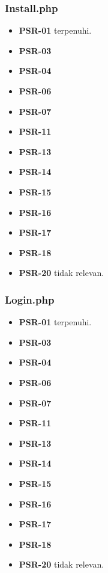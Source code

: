\subsubsection{Install.php}
\begin{itemize}
	\item \textbf{PSR-01} terpenuhi.
	\item \textbf{PSR-03}
	\item \textbf{PSR-04}
	\item \textbf{PSR-06}
	\item \textbf{PSR-07}
	\item \textbf{PSR-11}
	\item \textbf{PSR-13}
	\item \textbf{PSR-14}
	\item \textbf{PSR-15}
	\item \textbf{PSR-16}
	\item \textbf{PSR-17} 
	\item \textbf{PSR-18} 
	\item \textbf{PSR-20} tidak relevan.
\end{itemize}

\subsubsection{Login.php} 
\begin{itemize}
	\item \textbf{PSR-01} terpenuhi.
	\item \textbf{PSR-03}
	\item \textbf{PSR-04}
	\item \textbf{PSR-06}
	\item \textbf{PSR-07}
	\item \textbf{PSR-11}
	\item \textbf{PSR-13}
	\item \textbf{PSR-14}
	\item \textbf{PSR-15}
	\item \textbf{PSR-16}
	\item \textbf{PSR-17} 
	\item \textbf{PSR-18} 
	\item \textbf{PSR-20} tidak relevan.
\end{itemize}

